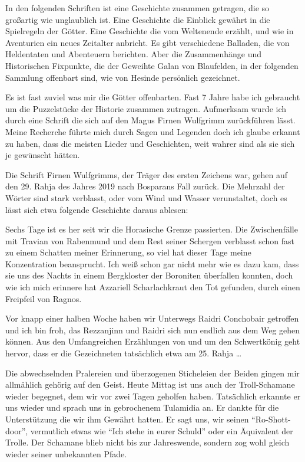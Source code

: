 In den folgenden Schriften ist eine Geschichte zusammen getragen, die so großartig wie unglaublich ist. Eine Geschichte die Einblick gewährt in die Spielregeln der Götter. Eine Geschichte die vom Weltenende erzählt, und wie in Aventurien ein neues Zeitalter anbricht. Es gibt verschiedene Balladen, die von Heldentaten und Abenteuern berichten. Aber die Zusammenhänge und Historischen Fixpunkte, die der Geweihte Galan von Blaufelden, in der folgenden Sammlung offenbart sind, wie von Hesinde persönlich gezeichnet.

Es ist fast zuviel was mir die Götter offenbarten. Fast 7 Jahre habe ich gebraucht um die Puzzelstücke der Historie zusammen zutragen. Aufmerksam wurde ich durch eine Schrift die sich auf den Magus Firnen Wulfgrimm zurückführen lässt. Meine Recherche führte mich durch Sagen und Legenden doch ich glaube erkannt zu haben, dass die meisten Lieder und Geschichten, weit wahrer sind als sie sich je gewünscht hätten.

Die Schrift Firnen Wulfgrimms, der Träger des ersten Zeichens war, gehen auf den 29. Rahja des Jahres 2019 nach Bosparans Fall zurück. Die Mehrzahl der Wörter sind stark verblasst, oder vom Wind und Wasser verunstaltet, doch es lässt sich etwa folgende Geschichte daraus ablesen:

Sechs Tage ist es her seit wir die Horasische Grenze passierten. Die Zwischenfälle mit Travian von Rabenmund und dem Rest seiner Schergen verblasst schon fast zu einem Schatten meiner Erinnerung, so viel hat dieser Tage meine Konzentration beansprucht. Ich weiß schon gar nicht mehr wie es dazu kam, dass sie uns des Nachts in einem Bergkloster der Boroniten überfallen konnten, doch wie ich mich erinnere hat Azzariell Scharlachkraut den Tot gefunden, durch einen Freipfeil von Ragnos.

Vor knapp einer halben Woche haben wir Unterwegs Raidri Conchobair getroffen und ich bin froh, das Rezzanjinn und Raidri sich nun endlich aus dem Weg gehen können. Aus den Umfangreichen Erzählungen von und um den Schwertkönig geht hervor, dass er die Gezeichneten tatsächlich etwa am 25. Rahja \dots

Die abwechselnden Pralereien und überzogenen Sticheleien der Beiden gingen mir allmählich gehörig auf den Geist. Heute Mittag ist uns auch der Troll-Schamane wieder begegnet, dem wir vor zwei Tagen geholfen haben. Tatsächlich erkannte er uns wieder und sprach uns in gebrochenem Tulamidia an. Er dankte für die Unterstützung die wir ihm Gewährt hatten. Er sagt uns, wir seinen ``Ro-Shott-door'', vermutlich etwas wie ``Ich stehe in eurer Schuld'' oder ein Äquivalent der Trolle. Der Schamane blieb nicht bis zur Jahreswende, sondern zog wohl gleich wieder seiner unbekannten Pfade.


